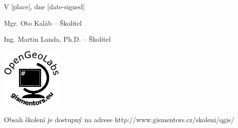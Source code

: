 \documentclass[12pt, a4paper]{letter}
\begin{document}
\vfill
\parbox{7cm}{

    V [place], dne [date-signed]\\

\vfill

    Mgr. Oto Kaláb -- Školitel\\

\vfill
    
    Ing. Martin Landa, Ph.D. -- Školitel

}
\hfill
\parbox{3cm}{
    \includegraphics[width=3cm]{../images/placka.eps}
}


\begin{center}
{\footnotesize Obsah školení je dostupný na adrese
http://www.gismentors.cz/skoleni/qgis/}
\end{center}
\end{document}
